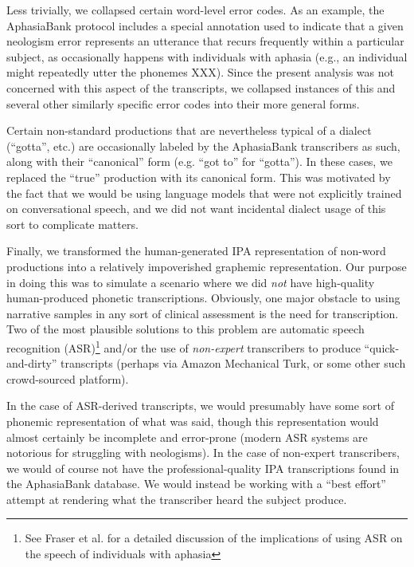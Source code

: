 \documentclass[11pt,letterpaper]{article}
\begin{document}
Less trivially, we collapsed certain word-level error codes.
As an example, the AphasiaBank protocol includes a special annotation used to indicate that a given neologism error represents an utterance that recurs frequently within a particular subject, as occasionally happens with individuals with aphasia (e.g., an individual might repeatedly utter the phonemes XXX). %
Since the present analysis was not concerned with this aspect of the transcripts, we collapsed instances of this and several other similarly specific error codes into their more general forms.

Certain non-standard productions that are nevertheless typical of a dialect (``gotta'', etc.) are occasionally labeled by the AphasiaBank transcribers as such, along with their ``canonical'' form (e.g. ``got to'' for ``gotta''). In these cases, we replaced the ``true'' production with its canonical form. This was motivated by the fact that we would be using  language models that were not explicitly trained on conversational speech, and we did not want incidental dialect usage of this sort to complicate matters.

Finally, we transformed the human-generated IPA representation of non-word productions into a relatively impoverished graphemic representation.
Our purpose in doing this was to simulate a scenario where we did \emph{not} have high-quality human-produced phonetic transcriptions. Obviously, one major obstacle to using narrative samples in any sort of clinical assessment is the need for transcription.
Two of the most plausible solutions to this problem are automatic speech recognition (ASR)\footnote{See Fraser et al.  for a detailed discussion of the implications of using ASR on the speech of individuals with aphasia} and/or the use of \emph{non-expert} transcribers to produce ``quick-and-dirty'' transcripts (perhaps via Amazon Mechanical Turk, or some other such crowd-sourced platform).

In the case of ASR-derived transcripts, we would presumably have some sort of phonemic representation of what was said, though this representation would almost certainly be incomplete and error-prone (modern ASR systems are notorious for struggling with neologisms).
In the case of non-expert transcribers, we would of course not have the professional-quality IPA transcriptions found in the AphasiaBank database.
We would instead be working with a ``best effort'' attempt at rendering what the transcriber heard the subject produce.
\end{document}
